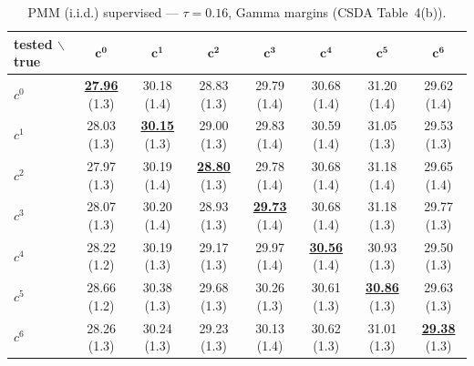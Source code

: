 \begin{table}[htbp]
  \centering
  \small
  \setlength{\tabcolsep}{4pt}
  \caption{PMM (i.i.d.) supervised — $\tau = 0.16$, Gamma margins (CSDA Table~4(b)).}
  \label{tab:exp2-low_tau_gamma}
  \begin{tabular}{lccccccc}
    \toprule
    tested $\backslash$ true & $\mathbf{c^{0}}$ & $\mathbf{c^{1}}$ & $\mathbf{c^{2}}$ & $\mathbf{c^{3}}$ & $\mathbf{c^{4}}$ & $\mathbf{c^{5}}$ & $\mathbf{c^{6}}$ \\
    \midrule
    $c^{0}$ & \textbf{\underline{27.96}} (1.3) & 30.18 (1.4) & 28.83 (1.3) & 29.79 (1.4) & 30.68 (1.4) & 31.20 (1.4) & 29.62 (1.4) \\
    $c^{1}$ & 28.03 (1.3) & \textbf{\underline{30.15}} (1.3) & 29.00 (1.3) & 29.83 (1.4) & 30.59 (1.4) & 31.05 (1.3) & 29.53 (1.3) \\
    $c^{2}$ & 27.97 (1.3) & 30.19 (1.4) & \textbf{\underline{28.80}} (1.3) & 29.78 (1.4) & 30.68 (1.4) & 31.18 (1.4) & 29.65 (1.4) \\
    $c^{3}$ & 28.07 (1.3) & 30.20 (1.4) & 28.93 (1.3) & \textbf{\underline{29.73}} (1.4) & 30.68 (1.4) & 31.18 (1.3) & 29.77 (1.3) \\
    $c^{4}$ & 28.22 (1.2) & 30.19 (1.3) & 29.17 (1.3) & 29.97 (1.4) & \textbf{\underline{30.56}} (1.4) & 30.93 (1.3) & 29.50 (1.3) \\
    $c^{5}$ & 28.66 (1.2) & 30.38 (1.3) & 29.68 (1.3) & 30.26 (1.3) & 30.61 (1.3) & \textbf{\underline{30.86}} (1.3) & 29.63 (1.3) \\
    $c^{6}$ & 28.26 (1.3) & 30.24 (1.3) & 29.23 (1.3) & 30.13 (1.4) & 30.62 (1.3) & 31.01 (1.3) & \textbf{\underline{29.38}} (1.3) \\
    \bottomrule
  \end{tabular}
\end{table}
